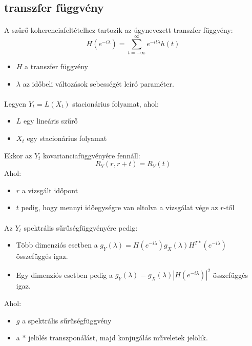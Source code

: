 \documentclass[11pt,a4paper]{article}
\begin{document}
				\subsection{transzfer függvény}
					\paragraph{}
						A szűrő koherenciafeltételhez tartozik az úgynevezett transzfer függvény:
						$$H \left(e^{-i \lambda} \right) = \sum_{t = -\infty}^{\infty} e^{-i t \lambda} h(t)$$
						\begin{itemize}
						    \item $H$ a transzfer függvény
						    \item $\lambda$ az időbeli változások sebességét leíró paraméter.
						\end{itemize}
					\paragraph{}
						Legyen $Y_t = L(X_t)$ stacionárius folyamat, ahol:
						\begin{itemize}
						    \item $L$ egy lineáris szűrő
						    \item $X_t$ egy stacionárius folyamat
						\end{itemize}
						
						Ekkor az $Y_t$ kovarianciafüggvényére fennáll:
						$$R_Y(r,r+t) = R_Y(t)$$
						Ahol:
						\begin{itemize}
						    \item $r$ a vizsgált időpont
						    \item $t$ pedig, hogy mennyi időegységre van eltolva a vizsgálat vége az $r$-től
						\end{itemize}
					\paragraph{}
						Az $Y_t$ spektrális sűrűségfüggvényére pedig:
						\begin{itemize}
						    \item Több dimenziós esetben a $g_Y(\lambda) = H\left(e^{-i \lambda} \right)g_X(\lambda)H^{T*}\left(e^{-i \lambda} \right)$ összefüggés igaz.
						    \item Egy dimenziós esetben pedig a $g_Y(\lambda) = g_X(\lambda)\left|H\left(e^{-i \lambda} \right)\right|^2$ összefüggés igaz.
						\end{itemize}
						Ahol:
						\begin{itemize}
						    \item $g$ a spektrális sűrűségfüggvény
						    \item a $*$ jelölés transzponálást, majd konjugálás műveletek jelölik.
						\end{itemize}
\end{document}
